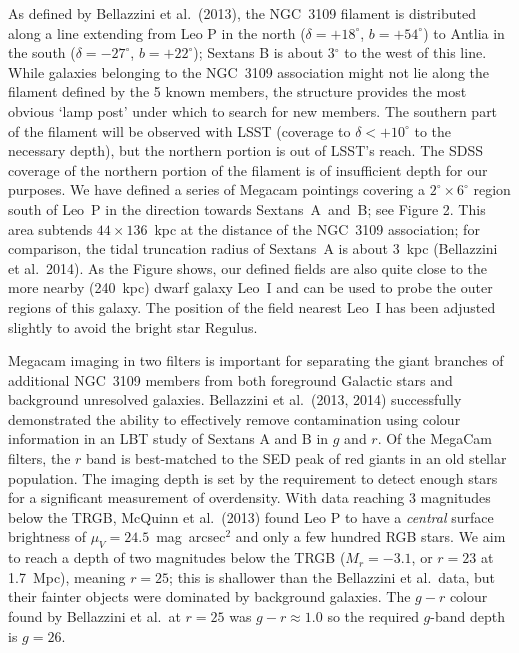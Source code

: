 As defined by Bellazzini et al.\ (2013), the NGC~3109 filament is  distributed along a line extending from Leo P in the 
north ($\delta = +18^{\circ}$, $b = +54^{\circ}$) to
Antlia in the south ($\delta = -27^{\circ}$, $b = +22^{\circ}$); Sextans B is about 3$^{\circ}$ to the west of this line.
While galaxies belonging to the NGC~3109 association might not lie along the filament defined by
the 5 known members, the structure provides the most obvious `lamp post' under which to search for new
members. The southern part of the filament will be observed with LSST (coverage to $\delta < +10^{\circ}$ to the necessary depth),
but the northern portion is out of LSST's reach. The SDSS coverage of the northern portion of the filament
is of insufficient depth for our purposes.
We have defined a series of Megacam pointings covering a $2^{\circ}\times6^{\circ}$ region south
of Leo~P in the direction towards Sextans~A~and~B; see Figure 2. This area subtends $44\times136$~kpc
at the distance of the NGC~3109 association; for comparison, the tidal truncation radius of Sextans~A is
about 3~kpc (Bellazzini et al.\ 2014). As the Figure shows,  our defined fields are also
quite close to the more nearby (240~kpc) dwarf galaxy Leo~I and can be used to probe the outer
regions of this galaxy. The position of the field nearest Leo~I has been adjusted slightly to avoid the
bright star Regulus.


Megacam imaging in two filters is important for separating the giant branches of additional NGC~3109
members from both foreground Galactic stars and background unresolved galaxies.  Bellazzini et al.\ (2013, 2014)
successfully demonstrated the ability to effectively remove contamination using colour information
in an LBT study of Sextans A and B in $g$ and $r$. Of the MegaCam filters, the $r$ band is best-matched to the SED 
peak of red giants in an old stellar population.
The imaging depth is set by the requirement to detect enough stars for a significant measurement of overdensity. 
With data reaching 3 magnitudes below the TRGB, McQuinn et al.\ (2013) found Leo P to have a {\em central} surface brightness 
of $\mu_V=24.5$~mag~arcsec$^2$ and only a few hundred RGB stars. We aim to reach 
a depth of two magnitudes below the TRGB ($M_r = -3.1$, or  $r=23$ at 1.7~Mpc), meaning $r=25$;
this is shallower than the Bellazzini et al.\  data, but their fainter objects were dominated by background galaxies. 
The $g-r$ colour found by Bellazzini et al.\ at $r=25$ was $g-r\approx 1.0$ so the required $g$-band depth is $g=26$.

